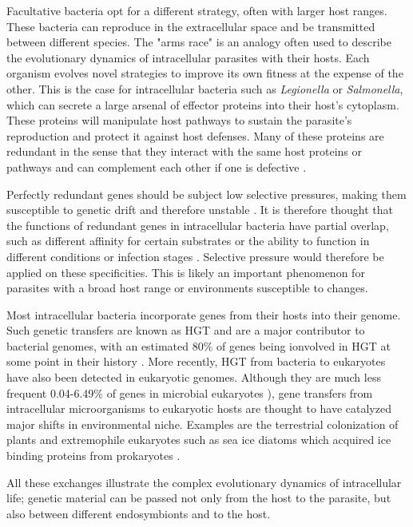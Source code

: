 Facultative bacteria opt for a different strategy, often with larger host ranges. These bacteria can reproduce in the extracellular space and be transmitted between different species. The "arms race" is an analogy often used to describe the evolutionary dynamics of intracellular parasites with their hosts. Each organism evolves novel strategies to improve its own fitness at the expense of the other. This is the case for intracellular bacteria such as \textit{Legionella} or \textit{Salmonella}, which can secrete a large arsenal of effector proteins into their host's cytoplasm. These proteins will manipulate host pathways to sustain the parasite's reproduction and protect it against host defenses. Many of these proteins are redundant in the sense that they interact with the same host proteins or pathways and can complement each other if one is defective \cite{Ghosh2017}.

Perfectly redundant genes should be subject low selective pressures, making them susceptible to genetic drift and therefore unstable \cite{Bergthorsson2007}. It is therefore thought that the functions of redundant genes in intracellular bacteria have partial overlap, such as different affinity for certain substrates or the ability to function in different conditions or infection stages \cite{Ghosh2017}. Selective pressure would therefore be applied on these specificities. This is likely an important phenomenon for parasites with a broad host range or environments susceptible to changes.

Most intracellular bacteria incorporate genes from their hosts into their genome. Such genetic transfers are known as \acrfull{HGT} and are a major contributor to bacterial genomes, with an estimated 80\% of genes being ionvolved in HGT at some point in their history \cite{Dagan2008}. More recently, HGT from bacteria to eukaryotes have also been detected in eukaryotic genomes. Although they are much less frequent 0.04-6.49\% of genes in microbial eukaryotes \cite{VanEtten2020}), gene transfers from intracellular microorganisms to eukaryotic hosts are thought to have catalyzed major shifts in environmental niche. Examples are the terrestrial colonization of plants and extremophile eukaryotes such as sea ice diatoms which acquired ice binding proteins from prokaryotes \cite{VanEtten2020}.

All these exchanges illustrate the complex evolutionary dynamics of intracellular life; genetic material can be passed not only from the host to the parasite, but also between different endosymbionts and to the host.

